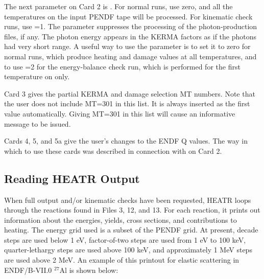The next parameter on Card 2 is .  For normal
runs, use zero, and all the temperatures on the input PENDF
tape will be processed.  For kinematic check runs, use
=1.  The  parameter suppresses
the processing of the photon-production files, if any.
The photon energy appears in the KERMA factors as if the
photons had very short range.  A useful way to use the
 parameter is to set it to zero for normal
runs, which produce heating and damage values at all
temperatures, and to use =2 for the
energy-balance check run, which is performed for the first
temperature on  only.

Card 3 gives the partial KERMA and damage selection MT
numbers.  Note that the user does not include MT=301 in this
list.  It is always inserted as the first value automatically.
Giving MT=301 in this list will cause an informative message
to be issued.

Cards 4, 5, and 5a give the user's changes to the ENDF Q
values.  The way in which to use these cards was described
in connection with  on Card 2.

\subsection{Reading HEATR Output}
\label{ssHEATR_output}

When full output and/or kinematic checks have been requested,
HEATR loops through the reactions found in Files 3, 12, and 13.
For each reaction, it prints out information about the energies,
yields, cross sections, and contributions to heating.
The energy grid used is a subset of the PENDF grid.
At present, decade steps are used below 1 eV, factor-of-two
steps are used from 1 eV to 100 keV, quarter-lethargy steps
are used above 100 keV, and approximately 1 MeV steps are used
above 2 MeV.  An example of this printout for elastic scattering
in ENDF/B-VII.0 $^{27}$Al is shown below:

